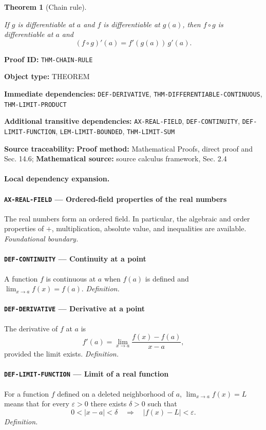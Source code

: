 \documentclass[10pt]{article}
\newcommand{\pidraw}[1]{\begingroup\urlstyle{tt}\nolinkurl{#1}\endgroup}
\newtheorem{theorem}{Theorem}[section]
\theoremstyle{definition}
\theoremstyle{remark}
\newcommand{\meta}[2]{\noindent\textbf{#1:} #2\par}
\begin{document}
\begin{theorem}[Chain rule]\label{prf:THM-CHAIN-RULE}

If $g$ is differentiable at $a$ and $f$ is differentiable at $g(a)$, then $f\circ g$ is differentiable at $a$ and
\[
(f\circ g)'(a)=f'(g(a))\,g'(a).
\]

\end{theorem}

\meta{Proof ID}{\pidraw{THM-CHAIN-RULE}}
\meta{Object type}{THEOREM}
\meta{Immediate dependencies}{\pidraw{DEF-DERIVATIVE}, \pidraw{THM-DIFFERENTIABLE-CONTINUOUS}, \pidraw{THM-LIMIT-PRODUCT}}
\meta{Additional transitive dependencies}{\pidraw{AX-REAL-FIELD}, \pidraw{DEF-CONTINUITY}, \pidraw{DEF-LIMIT-FUNCTION}, \pidraw{LEM-LIMIT-BOUNDED}, \pidraw{THM-LIMIT-SUM}}
\meta{Source traceability}{\textbf{Proof method:} Mathematical Proofs, direct proof and Sec. 14.6; \textbf{Mathematical source:} source calculus framework, Sec. 2.4}

\paragraph{Local dependency expansion.}

\paragraph{\pidraw{AX-REAL-FIELD} --- Ordered-field properties of the real numbers}
The real numbers form an ordered field. In particular, the algebraic and order properties of $+$, multiplication, absolute value, and inequalities are available.
\textit{Foundational boundary.}

\paragraph{\pidraw{DEF-CONTINUITY} --- Continuity at a point}
A function $f$ is continuous at $a$ when $f(a)$ is defined and $\lim_{x\to a}f(x)=f(a)$.
\textit{Definition.}

\paragraph{\pidraw{DEF-DERIVATIVE} --- Derivative at a point}
The derivative of $f$ at $a$ is
\[
f'(a)=\lim_{x\to a}\frac{f(x)-f(a)}{x-a},
\]
provided the limit exists.
\textit{Definition.}

\paragraph{\pidraw{DEF-LIMIT-FUNCTION} --- Limit of a real function}
For a function $f$ defined on a deleted neighborhood of $a$, $\lim_{x\to a}f(x)=L$ means that for every $\varepsilon>0$ there exists $\delta>0$ such that
\[
0<|x-a|<\delta\quad\Longrightarrow\quad |f(x)-L|<\varepsilon.
\]
\textit{Definition.}
\end{document}
